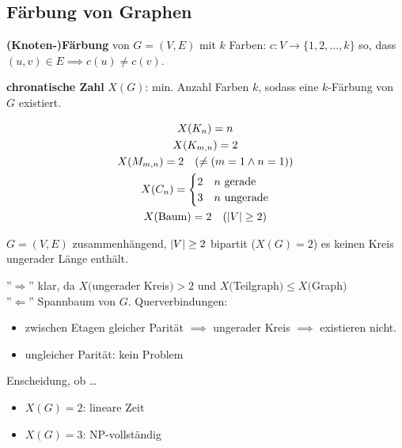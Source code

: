 \subsection{Färbung von Graphen}
\begin{def*}[note = Knotenfärbung , index = Knotenfärbung]
	\textbf{(Knoten-)Färbung} von $G=(V,E)$ mit $k$ Farben: $c: V \rightarrow \{ 1, 2, \dotsc , k \}$ so, dass $(u,v) \in E \implies c(u) \neq c(v)$.
\end{def*}
\begin{def*}[note = chromatische Zahl , index = chromatische Zahl]
	\textbf{chronatische Zahl} $X(G)$: min. Anzahl Farben $k$, sodass eine $k$-Färbung von $G$ existiert.
\end{def*}
\begin{bsp*}
	\begin{gather*}
		X(K_n) = n \\
		X(K_{m,n}) = 2 \\
		X(M_{m,n}) = 2 \quad ( \neq( m = 1 \wedge n = 1 )) \\
		X(C_n) = \begin{cases}
			2	&n \text{ gerade}	\\
			3	&n \text{ ungerade}
		\end{cases} \\
		X(\text{Baum}) = 2 \quad ( \abs{V} \geq 2 )
	\end{gather*}
\end{bsp*}
\begin{satz*}
	$G=(V,E)$ zusammenhängend, $\abs{V} \geq 2$ bipartit ($X(G) = 2$) \gdw es keinen Kreis ungerader Länge enthält.\\
	\begin{bew}
		''$\Rightarrow$'' klar, da $X($ungerader Kreis$) > 2$ und $X($Teilgraph$) \leq X($Graph$)$ \\
		''$\Leftarrow$'' Spannbaum von $G$. Querverbindungen:
		\begin{itemize}
			\item zwischen Etagen gleicher Parität $\implies$ ungerader Kreis $\implies$ existieren nicht.
			\item ungleicher Parität: kein Problem
		\end{itemize}
	\end{bew}
\end{satz*}

Enscheidung, ob \dots
\begin{itemize}
	\item $X(G) = 2$: lineare Zeit
	\item $X(G) = 3$: NP-vollständig
\end{itemize}


